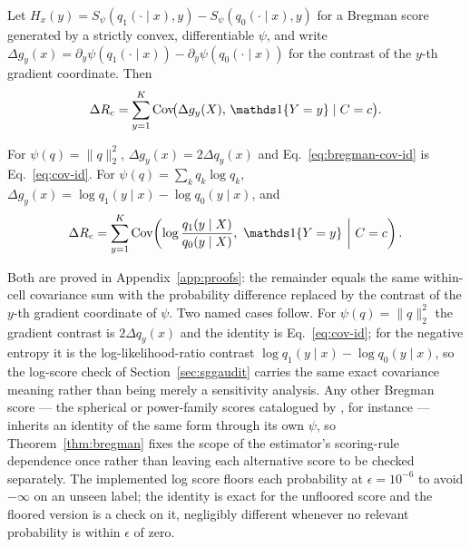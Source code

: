 \begin{theorem}\label{thm:bregman}
Let $H_x(y)=S_\psi(q_1(\cdot\mid x),y)-S_\psi(q_0(\cdot\mid x),y)$ for a Bregman score generated by a strictly convex, differentiable $\psi$, and write $\Delta g_y(x)=\partial_y\psi(q_1(\cdot\mid x))-\partial_y\psi(q_0(\cdot\mid x))$ for the contrast of the $y$-th gradient coordinate. Then
\begin{equation}
\Delta R_c=\sum_{y=1}^K\operatorname{Cov}\!\bigl(\Delta g_y(X),\,\ind\{Y=y\}\mid C=c\bigr).
\label{eq:bregman-cov-id}
\end{equation}
\end{theorem}

\begin{corollary}\label{cor:bregman}
For $\psi(q)=\lVert q\rVert_2^2$, $\Delta g_y(x)=2\Delta q_y(x)$ and Eq.~\eqref{eq:bregman-cov-id} is Eq.~\eqref{eq:cov-id}. For $\psi(q)=\sum_kq_k\log q_k$, $\Delta g_y(x)=\log q_1(y\mid x)-\log q_0(y\mid x)$, and
\begin{equation}
\Delta R_c=\sum_{y=1}^K\operatorname{Cov}\!\left(\log\frac{q_1(y\mid X)}{q_0(y\mid X)},\ \ind\{Y=y\}\ \middle|\ C=c\right).
\label{eq:log-cov-id}
\end{equation}
\end{corollary}

\noindent
Both are proved in Appendix~\ref{app:proofs}: the remainder equals the same within-cell
covariance sum with the probability difference replaced by the contrast of the $y$-th
gradient coordinate of $\psi$. Two named cases follow. For $\psi(q)=\lVert q\rVert_2^2$ the gradient contrast is
$2\Delta q_y(x)$ and the identity is Eq.~\eqref{eq:cov-id}; for the negative entropy it is
the log-likelihood-ratio contrast $\log q_1(y\mid x)-\log q_0(y\mid x)$, so the log-score
check of Section~\ref{sec:sggaudit} carries the same exact covariance meaning rather than
being merely a sensitivity analysis. Any other Bregman score --- the spherical or
power-family scores catalogued by \citet{gneiting2007proper}, for instance --- inherits an
identity of the same form through its own $\psi$, so Theorem~\ref{thm:bregman} fixes the
scope of the estimator's scoring-rule dependence once rather than leaving each alternative
score to be checked separately. The implemented log score floors each probability at
$\epsilon=10^{-6}$ to avoid $-\infty$ on an unseen label; the identity is exact for the
unfloored score and the floored version is a check on it, negligibly different whenever no
relevant probability is within $\epsilon$ of zero.

